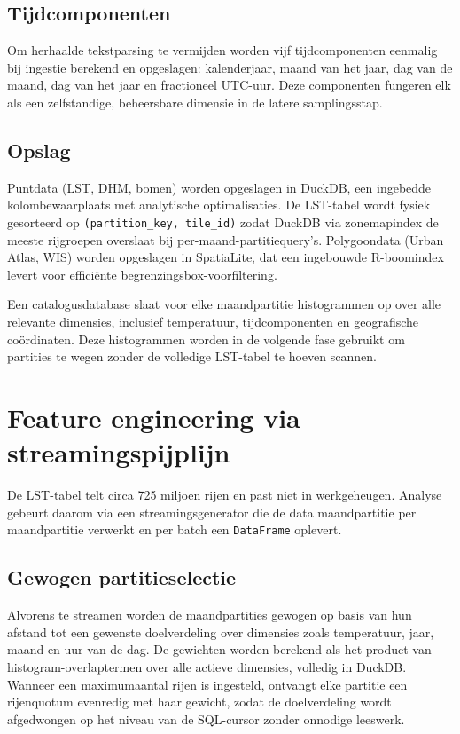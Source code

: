 \subsection{Tijdcomponenten}

Om herhaalde tekstparsing te vermijden worden vijf tijdcomponenten eenmalig bij ingestie berekend en opgeslagen: kalenderjaar, maand van het jaar, dag van de maand, dag van het jaar en fractioneel UTC-uur.
Deze componenten fungeren elk als een zelfstandige, beheersbare dimensie in de latere samplingsstap.

\subsection{Opslag}

Puntdata (LST, DHM, bomen) worden opgeslagen in DuckDB, een ingebedde kolombewaarplaats met analytische optimalisaties.
De LST-tabel wordt fysiek gesorteerd op \texttt{(partition\_key, tile\_id)} zodat DuckDB via zonemapindex de meeste rijgroepen overslaat bij per-maand-partitiequery's.
Polygoondata (Urban Atlas, WIS) worden opgeslagen in SpatiaLite, dat een ingebouwde R-boomindex levert voor efficiënte begrenzingsbox-voorfiltering.

Een catalogusdatabase slaat voor elke maandpartitie histogrammen op over alle relevante dimensies, inclusief temperatuur, tijdcomponenten en geografische coördinaten.
Deze histogrammen worden in de volgende fase gebruikt om partities te wegen zonder de volledige LST-tabel te hoeven scannen.

\section{Feature engineering via streamingspijplijn}
\label{sec:streaming}

De LST-tabel telt circa 725 miljoen rijen en past niet in werkgeheugen.
Analyse gebeurt daarom via een streamingsgenerator die de data maandpartitie per maandpartitie verwerkt en per batch een \texttt{DataFrame} oplevert.

\subsection{Gewogen partitieselectie}

Alvorens te streamen worden de maandpartities gewogen op basis van hun afstand tot een gewenste doelverdeling over dimensies zoals temperatuur, jaar, maand en uur van de dag.
De gewichten worden berekend als het product van histogram-overlaptermen over alle actieve dimensies, volledig in DuckDB.
Wanneer een maximumaantal rijen is ingesteld, ontvangt elke partitie een rijenquotum evenredig met haar gewicht, zodat de doelverdeling wordt afgedwongen op het niveau van de SQL-cursor zonder onnodige leeswerk.


